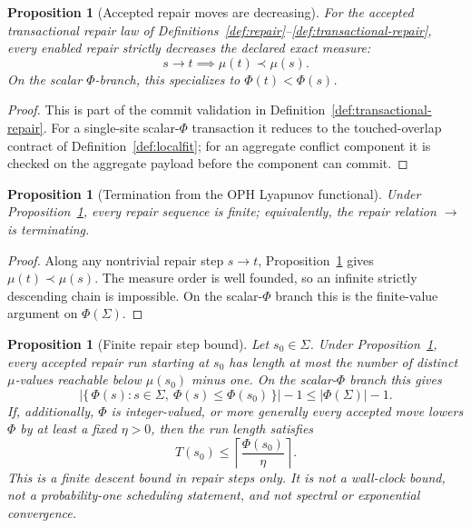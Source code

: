 \documentclass[11pt]{article}
\newtheorem{proposition}[theorem]{Proposition}
\theoremstyle{remark}
\theoremstyle{plain}
\begin{document}
\begin{proposition}[Accepted repair moves are decreasing]\label{prop:lyapunov-descent}
For the accepted transactional repair law of
Definitions~\ref{def:repair}--\ref{def:transactional-repair}, every enabled repair strictly
decreases the declared exact measure:
\[
s\to t \implies \mu(t)\prec\mu(s).
\]
On the scalar \(\Phi\)-branch, this specializes to \(\Phi(t)<\Phi(s)\).
\end{proposition}

\begin{proof}
This is part of the commit validation in Definition~\ref{def:transactional-repair}. For a
single-site scalar-\(\Phi\) transaction it reduces to the touched-overlap contract of
Definition~\ref{def:localfit}; for an aggregate conflict component it is checked on the aggregate
payload before the component can commit.
\end{proof}

\begin{proposition}[Termination from the OPH Lyapunov functional]\label{prop:lyapunov-termination}
Under Proposition~\ref{prop:lyapunov-descent}, every repair sequence is finite; equivalently, the
repair relation \(\to\) is terminating.
\end{proposition}

\begin{proof}
Along any nontrivial repair step \(s\to t\), Proposition~\ref{prop:lyapunov-descent} gives
\(\mu(t)\prec\mu(s)\). The measure order is well founded, so an infinite strictly descending chain
is impossible. On the scalar-\(\Phi\) branch this is the finite-value argument on
\(\Phi(\Sigma)\).
\end{proof}

\begin{proposition}[Finite repair step bound]\label{prop:finite-step-bound}
Let \(s_0\in\Sigma\). Under Proposition~\ref{prop:lyapunov-descent}, every accepted repair run
starting at \(s_0\) has length at most the number of distinct \(\mu\)-values reachable below
\(\mu(s_0)\) minus one. On the scalar-\(\Phi\) branch this gives
\[
\bigl|\{\,\Phi(s):s\in\Sigma,\ \Phi(s)\le \Phi(s_0)\,\}\bigr|-1
\le |\Phi(\Sigma)|-1.
\]
If, additionally, \(\Phi\) is integer-valued, or more generally every accepted move lowers
\(\Phi\) by at least a fixed \(\eta>0\), then the run length satisfies
\[
T(s_0)\le \left\lceil\frac{\Phi(s_0)}{\eta}\right\rceil .
\]
This is a finite descent bound in repair steps only. It is not a wall-clock bound, not a
probability-one scheduling statement, and not spectral or exponential convergence.
\end{proposition}
\end{document}
